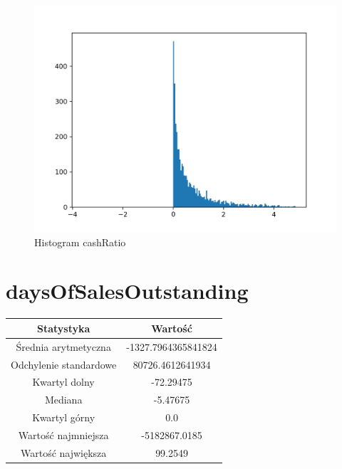 \documentclass{article}
\begin{document}
\begin{figure}[h!]
    \includegraphics[width=\linewidth]{variables/cashRatio.png}
    \caption{Histogram cashRatio }
\end{figure}\section{ daysOfSalesOutstanding }

\begin{center}
    \begin{tabular}{|c | c|} 
    \hline
    Statystyka & Wartość \\
    \hline\hline
    Średnia arytmetyczna & -1327.7964365841824 \\ 
    \hline
    Odchylenie standardowe & 80726.4612641934 \\
    \hline
    Kwartyl dolny & -72.29475 \\
    \hline
    Mediana & -5.47675 \\
    \hline
    Kwartyl górny & 0.0 \\
    \hline
    Wartość najmniejsza & -5182867.0185 \\
    \hline
    Wartość największa & 99.2549 \\
    \hline
   \end{tabular}
\end{center}
\end{document}
